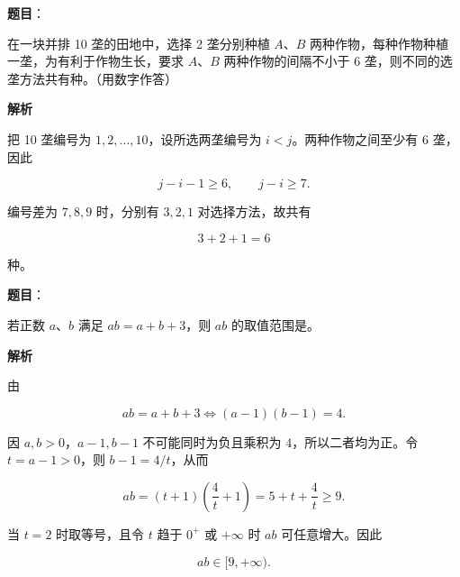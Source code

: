 \begin{answer}

\textbf{题目}：

在一块并排 10 垄的田地中，选择 2 垄分别种植 $A$、$B$ 两种作物，每种作物种植一垄，为有利于作物生长，要求 $A$、$B$ 两种作物的间隔不小于 6 垄，则不同的选垄方法共有\gkblank{}种。（用数字作答）

\textbf{解析}

把 10 垄编号为 $1,2,\ldots,10$，设所选两垄编号为 $i<j$。两种作物之间至少有 6 垄，因此

\nopagebreak[4]
\[
j-i-1\ge6,\qquad j-i\ge7.
\]

编号差为 $7,8,9$ 时，分别有 $3,2,1$ 对选择方法，故共有

\nopagebreak[4]
\[
3+2+1=6
\]

种。


\end{answer}
\begin{answer}

\textbf{题目}：

若正数 $a$、$b$ 满足 $ab=a+b+3$，则 $ab$ 的取值范围是\gkblank{}。

\textbf{解析}

由

\nopagebreak[4]
\[
ab=a+b+3
\Longleftrightarrow
(a-1)(b-1)=4.
\]

因 $a,b>0$，$a-1,b-1$ 不可能同时为负且乘积为 $4$，所以二者均为正。令 $t=a-1>0$，则 $b-1=4/t$，从而

\nopagebreak[4]
\[
ab=(t+1)\left(\frac4t+1\right)
=5+t+\frac4t\ge9.
\]

当 $t=2$ 时取等号，且令 $t$ 趋于 $0^+$ 或 $+\infty$ 时 $ab$ 可任意增大。因此

\nopagebreak[4]
\[
ab\in[9,+\infty).
\]

\gkanswer{答案：$[9,+\infty)$}

\end{answer}
